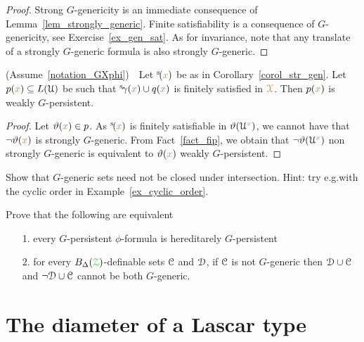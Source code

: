 \begin{proof}
  Strong $G$-genericity is an immediate consequence of Lemma~\ref{lem_strongly_generic}.
  Finite satisfiability is a consequence of $G$-genericity, see Exercise~\ref{ex_gen_sat}.
  As for invariance, note that any translate of a strongly $G$-generic formula is also strongly $G$-generic.
\end{proof}

\begin{corollary}\label{corol_q_w_pers}
  (Assume~\ref{notation_GXphi})\ \  
  Let ${}^{\rm s}\kern-.3ex({\color{brown} x})$ be as in Corollary~\ref{corol_str_gen}.
  Let $p({\color{brown} x})\subseteq L(\EuScript U)$ be such that ${}^{\rm s}\kern-.3ex\gamma({\color{brown} x})\cup q({\color{brown} x})$ is finitely satisfied in ${\color{brown}\EuScript X}$.
  Then $p({\color{brown} x})$ is weakly $G$-persistent.
\end{corollary}

\begin{proof}
  Let $\vartheta({\color{brown} x})\in p$.
  As ${}^{\rm s}\kern-.3ex({\color{brown} x})$ is finitely satisfiable in $\vartheta(\EuScript U^{\color{brown} x})$, we cannot have that $\neg\vartheta({\color{brown} x})$ is strongly $G$-generic.
  From Fact~\ref{fact_fip}, we obtain that $\neg\vartheta(\EuScript U^{\color{brown} x})$ non strongly $G$-generic is equivalent to $\vartheta({\color{brown} x})$ weakly $G$-persistent.
\end{proof}

\begin{exercise}
  Show that $G$-generic sets need not be closed under intersection.
  Hint: try e.g.\@ with the cyclic order in Example~\ref{ex_cyclic_order}.
\end{exercise}

\begin{exercise}
  Prove that the following are equivalent
  \begin{itemize}
    \item[1.] every $G$-persistent $\phi$-formula is hereditarely $G$-persistent
    \item[2.] for every $B_\Delta({{\color{green}\EuScript Z}})$-definable sets $\EuScript C$ and $\EuScript D$, if $\EuScript C$ is not $G$-generic then $\EuScript D\cup\EuScript C$ and $\neg\EuScript D\cup\EuScript C$ cannot be both $G$-generic.
  \end{itemize}
\end{exercise}


\section{The diameter of a Lascar type}\label{newelski}


